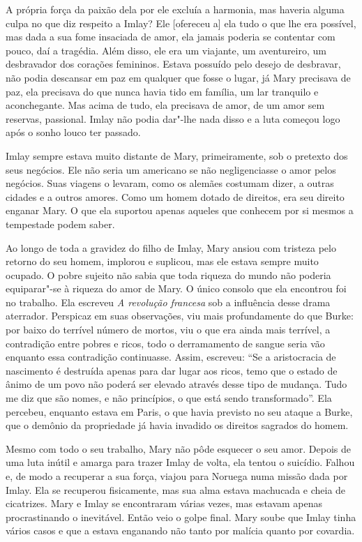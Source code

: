A própria força da paixão dela por ele excluía a harmonia, mas haveria
alguma culpa no que diz respeito a Imlay? Ele {[}ofereceu a{]} ela tudo
o que lhe era possível, mas dada a sua fome insaciada de amor, ela
jamais poderia se contentar com pouco, daí a tragédia. Além disso, ele
era um viajante, um aventureiro, um desbravador dos corações femininos.
Estava possuído pelo desejo de desbravar, não podia descansar em paz
em qualquer que fosse o lugar, já Mary precisava de paz, ela precisava
do que nunca havia tido em família, um lar tranquilo e aconchegante. Mas
acima de tudo, ela precisava de amor, de um amor sem reservas,
passional. Imlay não podia dar"-lhe nada disso e a luta começou logo após
o sonho louco ter passado.

Imlay sempre estava muito distante de Mary, primeiramente, sob o
pretexto dos seus negócios. Ele não seria um americano se não negligenciasse o
amor pelos negócios. Suas viagens o levaram, como os alemães costumam
dizer, a outras cidades e a outros amores. Como um homem dotado de
direitos, era seu direito enganar Mary. O que ela suportou apenas
aqueles que conhecem por si mesmos a tempestade podem saber.

Ao longo de toda a gravidez do filho de Imlay, Mary ansiou com tristeza
pelo retorno do seu homem, implorou e suplicou, mas ele estava sempre muito ocupado.
O pobre sujeito não sabia que toda riqueza do mundo não poderia
equiparar"-se à riqueza do amor de Mary. O único consolo que ela
encontrou foi no trabalho. Ela escreveu \emph{A revolução francesa} sob
a influência desse drama aterrador. Perspicaz em suas observações,
viu mais profundamente do que Burke: por baixo do terrível número de
mortos, viu o que era ainda mais terrível, a contradição entre
pobres e ricos, todo o derramamento de sangue seria vão enquanto essa
contradição continuasse. Assim, escreveu: ``Se a aristocracia de
nascimento é destruída apenas para dar lugar aos ricos, temo que o estado de ânimo de um povo não poderá ser elevado através desse tipo de mudança. Tudo me diz que
são nomes, e não princípios, o que está sendo transformado''. Ela
percebeu, enquanto estava em Paris, o que havia previsto no seu ataque a
Burke, que o demônio da propriedade já havia invadido os direitos
sagrados do homem.

Mesmo com todo o seu trabalho, Mary não pôde esquecer o seu amor. Depois
de uma luta inútil e amarga para trazer Imlay de volta, ela tentou o
suicídio. Falhou e, de modo a recuperar a sua força, viajou para Noruega
numa missão dada por Imlay. Ela se recuperou fisicamente, mas sua alma
estava machucada e cheia de cicatrizes. Mary e Imlay se encontraram várias
vezes, mas estavam apenas procrastinando o inevitável. Então veio o
golpe final. Mary soube que Imlay tinha vários casos e que a estava
enganando não tanto por malícia quanto por covardia.

